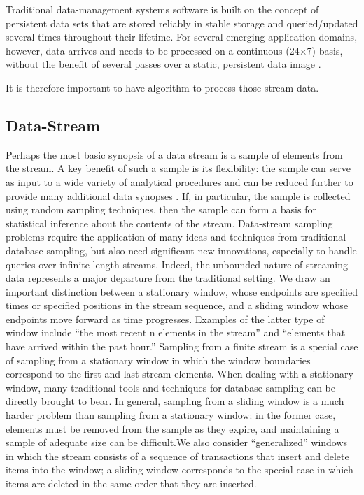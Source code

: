 \documentclass[twoside,12pt, a4paper]{report}
\begin{document}
Traditional data-management systems software is built on the concept of persistent
data sets that are stored reliably in stable storage and queried/updated several
times throughout their lifetime. For several emerging application domains, however,
data arrives and needs to be processed on a continuous (24×7) basis, without
the benefit of several passes over a static, persistent data image \cite{garofalakis2016data}. 

It is therefore important to have algorithm to process those stream data.

\subsection{Data-Stream}

Perhaps the most basic synopsis of a data stream is a sample of elements from the
stream. A key benefit of such a sample is its flexibility: the sample can serve as input
to a wide variety of analytical procedures and can be reduced further to provide
many additional data synopses \cite{garofalakis2016data}. If, in particular, the sample is collected using random
sampling techniques, then the sample can form a basis for statistical inference
about the contents of the stream. Data-stream sampling problems require the application of many ideas and techniques
from traditional database sampling, but also need significant new innovations,
especially to handle queries over infinite-length streams. Indeed, the unbounded
nature of streaming data represents a major departure from the traditional
setting. We draw an important distinction
between a stationary window, whose endpoints are specified times or specified
positions in the stream sequence, and a sliding window whose endpoints move forward
as time progresses. Examples of the latter type of window include “the most
recent n elements in the stream” and “elements that have arrived within the past
hour.” Sampling from a finite stream is a special case of sampling from a stationary
window in which the window boundaries correspond to the first and last stream
elements. When dealing with a stationary window, many traditional tools and techniques
for database sampling can be directly brought to bear. In general, sampling
from a sliding window is a much harder problem than sampling from a stationary
window: in the former case, elements must be removed from the sample as they
expire, and maintaining a sample of adequate size can be difficult.We also consider
“generalized” windows in which the stream consists of a sequence of transactions
that insert and delete items into the window; a sliding window corresponds to the
special case in which items are deleted in the same order that they are inserted.
\end{document}
